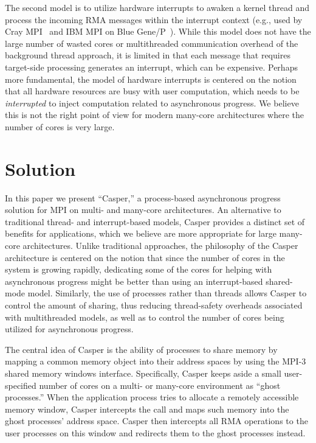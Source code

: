 The second model is to utilize hardware interrupts to awaken a kernel
thread and process the incoming RMA messages within the interrupt
context (e.g., used by Cray MPI~\cite{craympi} and IBM MPI on Blue
Gene/P~\cite[Chapter~7]{ibmmpibgp}).  While this model does not have
the large number of wasted cores or multithreaded communication
overhead of the background thread approach, it is limited in that each
message that requires target-side processing generates an interrupt,
which can be expensive.  Perhaps more fundamental, the model of
hardware interrupts is centered on the notion that all
hardware resources are busy with user computation, which needs to be
\emph{interrupted} to inject computation related to asynchronous
progress.  We believe this is not the right point of view for modern
many-core architectures where the number of cores is very large.

\section{Solution}

In this paper we present ``Casper,'' a process-based asynchronous
progress solution for MPI on multi- and many-core architectures.
An alternative to traditional thread- and interrupt-based
models, Casper provides a distinct set of benefits for applications,
 which we believe are more appropriate for large many-core
architectures.  Unlike traditional approaches, the philosophy of the
Casper architecture is centered on the notion that since the number of
cores in the system is growing rapidly, dedicating some of
the cores for helping with asynchronous progress might be better
than using an interrupt-based shared-mode model.  Similarly, the use
of processes rather than threads allows Casper to control the amount
of sharing, thus reducing thread-safety overheads associated with
multithreaded models, as well as to control the number of cores being
utilized for asynchronous progress.

The central idea of Casper is the ability of processes to share
memory by mapping a common memory object into their address spaces
by using the MPI-3 shared memory windows interface.  Specifically, Casper
keeps aside a small user-specified number of cores on a multi- or
many-core environment as ``ghost processes.''  When the application
process tries to allocate a remotely accessible memory window, Casper
intercepts the call and maps such memory into the ghost processes'
address space.  Casper then intercepts all RMA operations to the user
processes on this window and redirects them to the ghost processes
instead.

